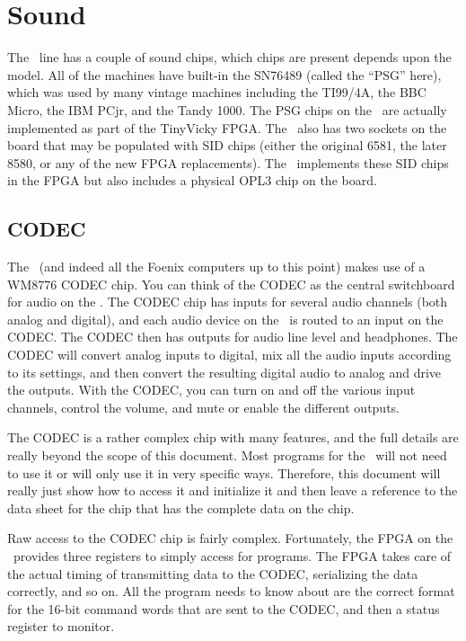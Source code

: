 \chapter{Sound}

The \jr\ line has a couple of sound chips, which chips are present depends upon the model. All of the machines have built-in the SN76489 (called the ``PSG'' here), which was used by many vintage machines including the TI99/4A, the BBC Micro, the IBM PCjr, and the Tandy 1000. The PSG chips on the \jr\ are actually implemented as part of the TinyVicky FPGA. The \fjr\ also has two sockets on the board that may be populated with SID chips (either the original 6581, the later 8580, or any of the new FPGA replacements). The \fk\ implements these SID chips in the FPGA but also includes a physical OPL3 chip on the board.

\section*{CODEC}

The \jr\ (and indeed all the Foenix computers up to this point) makes use of a WM8776 CODEC chip. You can think of the CODEC as the central switchboard for audio on the \jr. The CODEC chip has inputs for several audio channels (both analog and digital), and each audio device on the \jr\ is routed to an input on the CODEC. The CODEC then has outputs for audio line level and headphones. The CODEC will convert analog inputs to digital, mix all the audio inputs according to its settings, and then convert the resulting digital audio to analog and drive the outputs. With the CODEC, you can turn on and off the various input channels, control the volume, and mute or enable the different outputs.

The CODEC is a rather complex chip with many features, and the full details are really beyond the scope of this document. Most programs for the \jr\ will not need to use it or will only use it in very specific ways. Therefore, this document will really just show how to access it and initialize it and then leave a reference to the data sheet for the chip that has the complete data on the chip.

Raw access to the CODEC chip is fairly complex. Fortunately, the FPGA on the \jr\ provides three registers to simply access for programs. The FPGA takes care of the actual timing of transmitting data to the CODEC, serializing the data correctly, and so on. All the program needs to know about are the correct format for the 16-bit command words that are sent to the CODEC, and then a status register to monitor.

